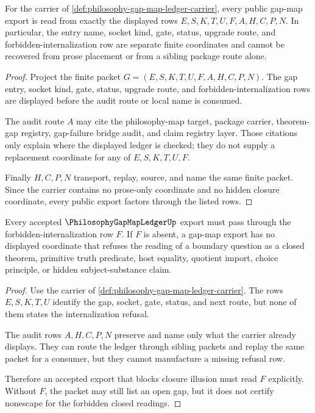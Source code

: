 \begin{theorem}
\label{thm:philosophy-gap-map-ledger-exactness}
For the carrier of \autoref{def:philosophy-gap-map-ledger-carrier}, every public gap-map export is read from exactly the displayed rows $E,S,K,T,U,F,A,H,C,P,N$. In particular, the entry name, socket kind, gate, status, upgrade route, and forbidden-internalization row are separate finite coordinates and cannot be recovered from prose placement or from a sibling package route alone.
\end{theorem}
\begin{proof}
Project the finite packet $G=(E,S,K,T,U,F,A,H,C,P,N)$. The gap entry, socket kind, gate, status, upgrade route, and forbidden-internalization rows are displayed before the audit route or local name is consumed.

The audit route $A$ may cite the philosophy-map target, package carrier, theorem-gap registry, gap-failure bridge audit, and claim registry layer. Those citations only explain where the displayed ledger is checked; they do not supply a replacement coordinate for any of $E,S,K,T,U,F$.

Finally $H,C,P,N$ transport, replay, source, and name the same finite packet. Since the carrier contains no prose-only coordinate and no hidden closure coordinate, every public export factors through the listed rows.
\end{proof}

\begin{theorem}
\label{thm:philosophy-gap-map-ledger-nonescape}
Every accepted $\PhilosophyGapMapLedgerUp$ export must pass through the forbidden-internalization row $F$. If $F$ is absent, a gap-map export has no displayed coordinate that refuses the reading of a boundary question as a closed theorem, primitive truth predicate, host equality, quotient import, choice principle, or hidden subject-substance claim.
\end{theorem}
\begin{proof}
Use the carrier of \autoref{def:philosophy-gap-map-ledger-carrier}. The rows $E,S,K,T,U$ identify the gap, socket, gate, status, and next route, but none of them states the internalization refusal.

The audit rows $A,H,C,P,N$ preserve and name only what the carrier already displays. They can route the ledger through sibling packets and replay the same packet for a consumer, but they cannot manufacture a missing refusal row.

Therefore an accepted export that blocks closure illusion must read $F$ explicitly. Without $F$, the packet may still list an open gap, but it does not certify nonescape for the forbidden closed readings.
\end{proof}

